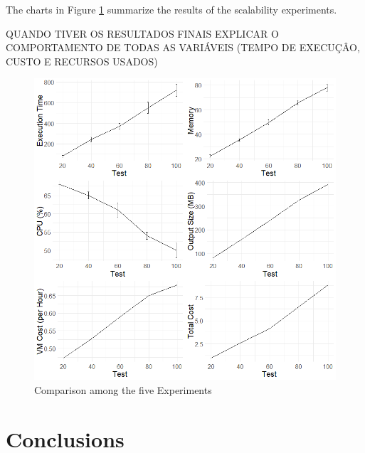 The charts in Figure \ref{fig:exp20} summarize the results of the scalability experiments.

QUANDO TIVER OS RESULTADOS FINAIS EXPLICAR O COMPORTAMENTO DE TODAS AS VARIÁVEIS (TEMPO DE EXECUÇÂO, CUSTO E RECURSOS USADOS)

\begin{figure}[!htb]
\centering
\includegraphics[width=1\textwidth]{figuras/chap-exp/dados.png}
\caption{Comparison among the five Experiments}
\label{fig:exp20}
\end{figure}


\section{Conclusions}
\label{sec:conclusions_exp}